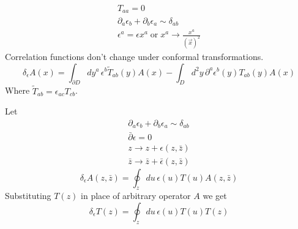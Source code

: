 \documentclass[a4paper,12pt]{article}
\theoremstyle{definition} \newtheorem{Def}{Definition}
\begin{document}
\begin{equation}
  \label{eq:53}
  \begin{split}
    T_{aa}=0\\
    \partial_a \epsilon_b+\partial_b \epsilon_a\sim \delta_{ab}\\
    \epsilon^a=\epsilon x^a \;\mbox{or}\; x^a\to \frac{x^a}{(\vec x)^2}
  \end{split}
\end{equation}
Correlation functions don't change under conformal transformations.
\begin{equation}
  \label{eq:54}
  \delta_{\epsilon}A(x)=\int_{\partial D} dy^a\, \epsilon^b \tilde{T}_{ab}(y)A(x)-\int_{D}d^2y\, \partial^a \epsilon^b(y)T_{ab}(y)A(x)
\end{equation}
Where $\tilde{T}_{ab}=\epsilon_{ac}T_{cb}$.

Let
\begin{equation}
  \label{eq:55}
  \begin{split}
    \partial_a \epsilon_b+\partial_b \epsilon_a\sim \delta_{ab}\\
    \bar{\partial}\epsilon=0\\
    z\to z+\epsilon(z,\bar{z})\\
    \bar{z}\to\bar{z}+\bar{\epsilon}(z,\bar{z})
  \end{split}
\end{equation}
\begin{equation}
  \label{eq:56}
  \delta_{\epsilon}A(z,\bar{z})=\oint_z du\, \epsilon(u) T(u) A(z,\bar{z})
\end{equation}
Substituting $T(z)$ in place of arbitrary operator $A$ we get 
\begin{equation}
  \label{eq:57}
  \delta_{\epsilon}T(z)=\oint_z du\, \epsilon(u)T(u)T(z)
\end{equation}
\end{document}
